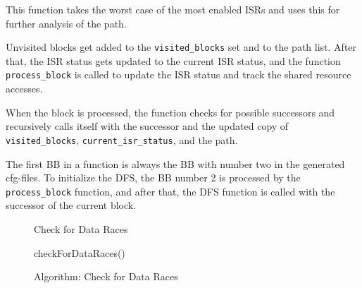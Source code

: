 \documentclass[
fancyheadings, %
%
%
]{stsreprt}
\begin{document}
{This function takes the worst case of the most enabled \acp{ISR} and uses this for further analysis of the path.

Unvisited blocks get added to the \texttt{visited\_blocks} set and to the path list. After that, the \ac{ISR} status gets updated to the current \ac{ISR} status, and the function \texttt{process\_block} is called to update the \ac{ISR} status and track the shared resource accesses.

When the block is processed, the function checks for possible successors and recursively calls itself with the successor and the updated copy of \texttt{visited\_blocks}, \texttt{current\_isr\_status}, and the path.

The first \ac{BB} in a function is always the \ac{BB} with number two in the generated cfg-files. To initialize the \ac{DFS}, the \ac{BB} number 2 is processed by the \texttt{process\_block} function, and after that, the \ac{DFS} function is called with the successor of the current block.


\begin{figure}[H]
	\centering
\begin{algorithm}[H]
	\caption{Check for Data Races}
	\DontPrintSemicolon
	\SetAlgoLined
	\BlankLine
	checkForDataRaces()\;
\end{algorithm}
\caption{Algorithm: Check for Data Races}
\end{figure}
\vspace{1cm}

}
\end{document}
